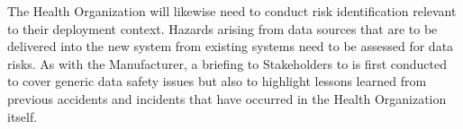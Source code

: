 \begin{minipage}[t]{0.73\textwidth}
  The Health Organization will likewise need to conduct risk identification relevant to their deployment context. Hazards arising from data sources that are to be delivered into the new system from existing systems need to be assessed for data risks.
  As with the Manufacturer, a briefing to Stakeholders to  is first conducted to cover generic data safety issues but also to highlight lessons learned from previous accidents and incidents that have occurred in the Health Organization itself.
\end{minipage}
\begin{minipage}[t]{0.25\textwidth}
  \centering{}
\end{minipage}


